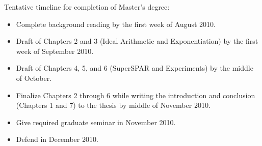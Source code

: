 \documentclass[11pt, letterpaper]{article}
\theoremstyle{definition}
\begin{document}
Tentative timeline for completion of Master's degree:

\begin{itemize}

\item Complete background reading by the first week of August 2010.

\item Draft of Chapters 2 and 3 (Ideal Arithmetic and Exponentiation) by the first week of September 2010.

\item Draft of Chapters 4, 5, and 6 (SuperSPAR and Experiments) by the middle of October.

\item Finalize Chapters 2 through 6 while writing the introduction and conclusion (Chapters 1 and 7) to the thesis by middle of November 2010.

\item Give required graduate seminar in November 2010.

\item Defend in December 2010.

\end{itemize}
\end{document}
